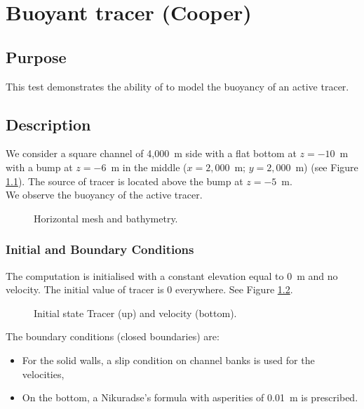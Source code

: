 \chapter{Buoyant tracer (Cooper)}

\section{Purpose}

This test demonstrates the ability of  to model the buoyancy
of an active tracer.

\section{Description}

We consider a square channel of 4,000~m side with a flat bottom at
$z = -10$~m with a bump at $z = -6$~m in the middle
($x = 2,000$~m; $y = 2,000$~m) (see Figure \ref{fig:Cooper:bottom}).
The source of tracer is located above the bump at $z = -5$~m.\\
We observe the buoyancy of the active tracer.

\begin{figure}[H]
 \centering
{}
 \caption{Horizontal mesh and bathymetry.}\label{fig:Cooper:bottom}
\end{figure}

\subsection{Initial and Boundary Conditions}

The computation is initialised with a constant elevation equal to 0~m
and no velocity.
The initial value of tracer is 0 everywhere.
See Figure \ref{fig:Cooper:initial}.

\begin{figure}[H]
 \centering
{}
 \caption{Initial state Tracer (up) and velocity (bottom).}\label{fig:Cooper:initial}
\end{figure}

The boundary conditions (closed boundaries) are:
\begin{itemize}
\item For the solid walls, a slip condition on channel banks is used for the
velocities,
\item On the bottom, a Nikuradse’s formula with asperities of 0.01~m
is prescribed.
\end{itemize}

